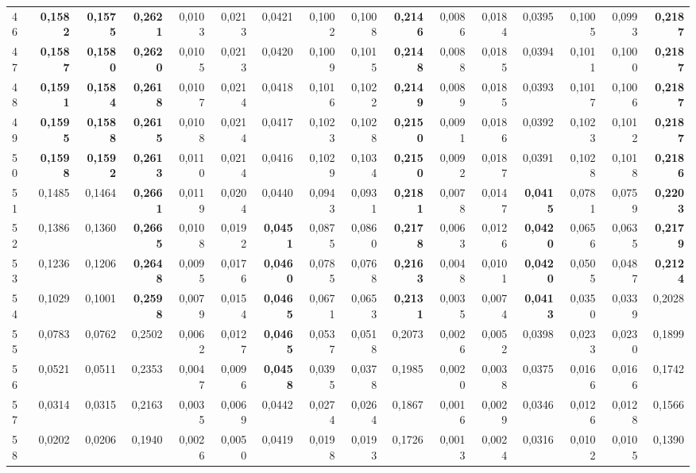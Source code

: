 \begin{table}[htp!]
\begin{adjustwidth}{-2cm}{}
\begin{tabular}{ l | *{15}{| r}}
46	&	\textbf{0,1582}	&	\textbf{0,1575}	&	\textbf{0,2621}	&	0,0103	&	0,0213	&	0,0421	&	0,1002	&	0,1008	&	\textbf{0,2146}	&	0,0086	&	0,0184	&	0,0395	&	0,1005	&	0,0993	&	\textbf{0,2187}	\\
47	&	\textbf{0,1587}	&	\textbf{0,1580}	&	\textbf{0,2620}	&	0,0105	&	0,0213	&	0,0420	&	0,1009	&	0,1015	&	\textbf{0,2148}	&	0,0088	&	0,0185	&	0,0394	&	0,1011	&	0,1000	&	\textbf{0,2187}	\\
48	&	\textbf{0,1591}	&	\textbf{0,1584}	&	\textbf{0,2618}	&	0,0107	&	0,0214	&	0,0418	&	0,1016	&	0,1022	&	\textbf{0,2149}	&	0,0089	&	0,0185	&	0,0393	&	0,1017	&	0,1006	&	\textbf{0,2187}	\\
49	&	\textbf{0,1595}	&	\textbf{0,1588}	&	\textbf{0,2615}	&	0,0108	&	0,0214	&	0,0417	&	0,1023	&	0,1028	&	\textbf{0,2150}	&	0,0091	&	0,0186	&	0,0392	&	0,1023	&	0,1012	&	\textbf{0,2187}	\\
50	&	\textbf{0,1598}	&	\textbf{0,1592}	&	\textbf{0,2613}	&	0,0110	&	0,0214	&	0,0416	&	0,1029	&	0,1034	&	\textbf{0,2150}	&	0,0092	&	0,0187	&	0,0391	&	0,1028	&	0,1018	&	\textbf{0,2186}	\\
51	&	0,1485	&	0,1464	&	\textbf{0,2661}	&	0,0119	&	0,0204	&	0,0440	&	0,0943	&	0,0931	&	\textbf{0,2181}	&	0,0078	&	0,0147	&	\textbf{0,0415}	&	0,0781	&	0,0759	&	\textbf{0,2203}	\\
52	&	0,1386	&	0,1360	&	\textbf{0,2665}	&	0,0108	&	0,0192	&	\textbf{0,0451}	&	0,0875	&	0,0860	&	\textbf{0,2178}	&	0,0063	&	0,0126	&	\textbf{0,0420}	&	0,0656	&	0,0635	&	\textbf{0,2179}	\\
53	&	0,1236	&	0,1206	&	\textbf{0,2648}	&	0,0095	&	0,0176	&	\textbf{0,0460}	&	0,0785	&	0,0768	&	\textbf{0,2163}	&	0,0048	&	0,0101	&	\textbf{0,0420}	&	0,0505	&	0,0487	&	\textbf{0,2124}	\\
54	&	0,1029	&	0,1001	&	\textbf{0,2598}	&	0,0079	&	0,0154	&	\textbf{0,0465}	&	0,0671	&	0,0653	&	\textbf{0,2131}	&	0,0035	&	0,0074	&	\textbf{0,0413}	&	0,0350	&	0,0339	&	0,2028	\\
55	&	0,0783	&	0,0762	&	0,2502	&	0,0062	&	0,0127	&	\textbf{0,0465}	&	0,0537	&	0,0518	&	0,2073	&	0,0026	&	0,0052	&	0,0398	&	0,0233	&	0,0230	&	0,1899	\\
56	&	0,0521	&	0,0511	&	0,2353	&	0,0047	&	0,0096	&	\textbf{0,0458}	&	0,0395	&	0,0378	&	0,1985	&	0,0020	&	0,0038	&	0,0375	&	0,0166	&	0,0166	&	0,1742	\\
57	&	0,0314	&	0,0315	&	0,2163	&	0,0035	&	0,0069	&	0,0442	&	0,0274	&	0,0264	&	0,1867	&	0,0016	&	0,0029	&	0,0346	&	0,0126	&	0,0128	&	0,1566	\\
58	&	0,0202	&	0,0206	&	0,1940	&	0,0026	&	0,0050	&	0,0419	&	0,0198	&	0,0193	&	0,1726	&	0,0013	&	0,0024	&	0,0316	&	0,0102	&	0,0105	&	0,1390	\\

\end{tabular}
\end{adjustwidth}
\end{table}

